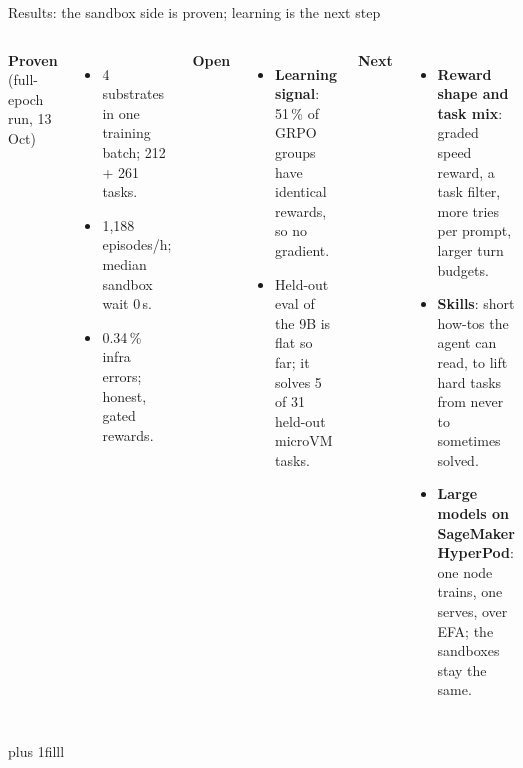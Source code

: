 \begin{frame}{Results: the sandbox side is proven; learning is the next step}
\begin{columns}[T]
{\normalsize\textbf{\textcolor{awsteal}{Proven}} \small(full-epoch run, 13 Oct)}
\begin{itemize}\small\setlength{\itemsep}{1.2mm}
\item 4 substrates in one training batch; 212 + 261 tasks.
\item 1{,}188 episodes/h; median sandbox wait 0\,s.
\item 0.34\,\% infra errors; honest, gated rewards.
\end{itemize}
\vspace{1mm}
{\normalsize\textbf{\textcolor{awsmagenta}{Open}}}
\begin{itemize}\small\setlength{\itemsep}{1.2mm}
\item \textbf{Learning signal}: 51\,\% of GRPO groups have identical rewards, so no gradient.
\item Held-out eval of the 9B is flat so far; it solves 5 of 31 held-out microVM tasks.
\end{itemize}
{\normalsize\textbf{Next}}
\begin{itemize}\small\setlength{\itemsep}{1.2mm}
\item \textbf{Reward shape and task mix}: graded speed reward, a task filter, more tries per prompt, larger turn budgets.
\item \textbf{Skills}: short how-tos the agent can read, to lift hard tasks from never to sometimes solved.
\item \textbf{Large models on SageMaker HyperPod}: one node trains, one serves, over EFA; the sandboxes stay the same.
\end{itemize}
\end{columns}
\par\vskip 0pt plus 1filll
\end{frame}

